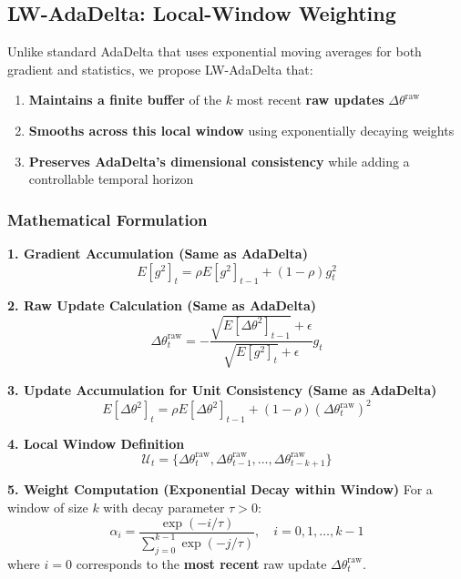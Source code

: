 \documentclass[11pt,a4paper]{article}
\begin{document}
\subsection{LW-AdaDelta: Local-Window Weighting}

Unlike standard AdaDelta that uses exponential moving averages for both gradient and statistics, we propose LW-AdaDelta that:
\begin{enumerate}
    \item \textbf{Maintains a finite buffer} of the $k$ most recent \textbf{raw updates} $\Delta\theta^{\text{raw}}$
    \item \textbf{Smooths across this local window} using exponentially decaying weights
    \item \textbf{Preserves AdaDelta's dimensional consistency} while adding a controllable temporal horizon
\end{enumerate}

\subsubsection{Mathematical Formulation}

\textbf{1. Gradient Accumulation (Same as AdaDelta)}
\begin{equation}
E[g^2]_t = \rho E[g^2]_{t-1} + (1-\rho) g_t^2
\end{equation}

\textbf{2. Raw Update Calculation (Same as AdaDelta)}
\begin{equation}
\Delta\theta_t^{\text{raw}} = - \frac{\sqrt{E[\Delta\theta^2]_{t-1}} + \epsilon}{\sqrt{E[g^2]_t} + \epsilon} g_t
\end{equation}

\textbf{3. Update Accumulation for Unit Consistency (Same as AdaDelta)}
\begin{equation}
E[\Delta\theta^2]_t = \rho E[\Delta\theta^2]_{t-1} + (1-\rho)(\Delta\theta_t^{\text{raw}})^2
\end{equation}

\textbf{4. Local Window Definition}
\begin{equation}
\mathcal{U}_t = \{\Delta\theta_t^{\text{raw}}, \Delta\theta_{t-1}^{\text{raw}}, \ldots, \Delta\theta_{t-k+1}^{\text{raw}}\}
\end{equation}

\textbf{5. Weight Computation (Exponential Decay within Window)}
For a window of size $k$ with decay parameter $\tau > 0$:
\begin{equation}
\alpha_i = \frac{\exp(-i/\tau)}{\sum_{j=0}^{k-1} \exp(-j/\tau)}, \quad i = 0,1,\ldots,k-1
\end{equation}
where $i = 0$ corresponds to the \textbf{most recent} raw update $\Delta\theta_t^{\text{raw}}$.
\end{document}
